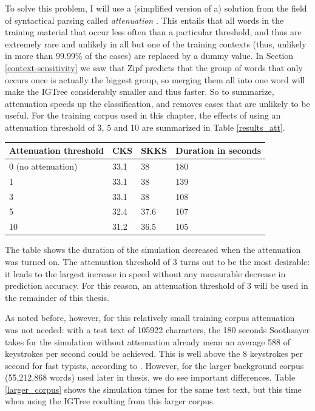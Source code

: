 \documentclass[11pt]{article}
\let\originaltable\table
\let\endoriginaltable\endtable
\renewenvironment{table}[1][ht]{%
  \originaltable[#1]
  \centering}%
  {\endoriginaltable}
\begin{document}
To solve this problem, I will use a (simplified version of a) solution from the field of syntactical parsing called \emph{attenuation} \cite{eisner96}. This entails that all words in the training material that occur less often than a particular threshold, and thus are extremely rare and unlikely in all but one of the training contexts (thus, unlikely in more than 99.99\% of the cases) are replaced by a dummy value. In Section \ref{context-sensitivity} we saw that Zipf predicts that the group of words that only occurs once is actually the biggest group, so merging them all into one word will make the IGTree considerably smaller and thus faster. So to summarize, attenuation speeds up the classification, and removes cases that are unlikely to be useful. For the training corpus used in this chapter, the effects of using an attenuation threshold of 3, 5 and 10 are summarized in Table \ref{results_att}.

\begin{table}[h]
\begin{tabular}{l|lll} 

Attenuation threshold&CKS&SKKS&Duration in seconds\\
\hline
0 (no attenuation)&33.1&38&180\\
1&33.1&38&139\\
3&33.1&38&108\\
5&32.4&37.6&107\\
10&31.2&36.5&105\\
\end{tabular} 
\caption{Percentage of keystrokes saved and simulation times with 4 attenuation thresholds.} \label{results_att}
\end{table}

The table shows the duration of the simulation decreased when the attenuation was turned on. The attenuation threshold of 3 turns out to be the most desirable: it leads to the largest increase in speed without any measurable decrease in prediction accuracy. For this reason, an attenuation threshold of 3 will be used in the remainder of this thesis.

As noted before, however, for this relatively small training corpus attenuation was not needed: with a test text of 105922 characters, the 180 seconds Soothsayer takes for the simulation without attenuation already mean an average 588 of keystrokes per second could be achieved. This is well above the 8 keystrokes per second for fast typists, according to . However, for the larger background corpus (55,212,868 words) used later in thesis, we do see important differences. Table \ref{larger_corpus} shows the simulation times for the same test text, but this time when using the IGTree resulting from this larger corpus.
\end{document}
